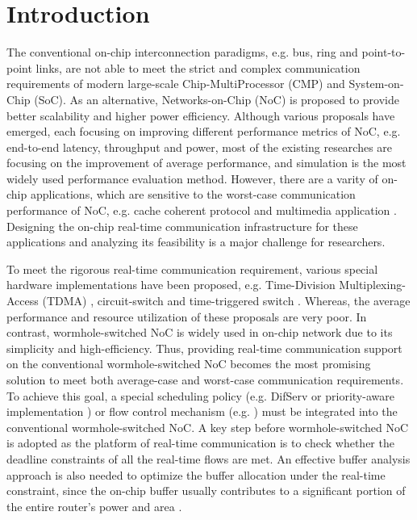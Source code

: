 \documentclass[10pt,journal]{IEEEtran}
\begin{document}
\section{Introduction}
The conventional on-chip interconnection paradigms, e.g. bus, ring and point-to-point links, are not able to meet the strict and complex communication requirements of modern large-scale Chip-MultiProcessor (CMP) and System-on-Chip (SoC). As an alternative, Networks-on-Chip (NoC) is proposed to provide better scalability and higher power efficiency. Although various proposals have emerged, each focusing on improving different performance metrics of NoC, e.g. end-to-end latency, throughput and power, most of the existing researches are focusing on the improvement of average performance, and simulation is the most widely used performance evaluation method. However, there are a varity of on-chip applications, which are sensitive to the worst-case communication performance of NoC, e.g. cache coherent protocol \cite{Bolotin2007} and multimedia application \cite{ostermann2004video}. Designing the on-chip real-time communication infrastructure for these applications and analyzing its feasibility is a major challenge for researchers.

To meet the rigorous real-time communication requirement, various special hardware implementations have been proposed, e.g. Time-Division Multiplexing-Access (TDMA) \cite{GoDR05}, circuit-switch \cite{6628254} and time-triggered switch \cite{4617280}. Whereas, the average performance and resource utilization of these proposals are very poor. In contrast, wormhole-switched NoC is widely used in on-chip network due to its simplicity and high-efficiency. Thus, providing real-time communication support on the conventional wormhole-switched NoC becomes the most promising solution to meet both average-case and worst-case communication requirements. To achieve this goal, a special scheduling policy (e.g. DifServ \cite{1411140} or priority-aware implementation \cite{Shi:2008:RCA:1397757.1397996,708526,627905}) or flow control mechanism (e.g. \cite{Li199649,707545}) must be integrated into the conventional wormhole-switched NoC. A key step before wormhole-switched NoC is adopted as the platform of real-time communication is to check whether the deadline constraints of all the real-time flows are met. An effective buffer analysis approach is also needed to optimize the buffer allocation under the real-time constraint, since the on-chip buffer usually contributes to a significant portion of the entire router's power and area \cite{pkundu,5507566}.
\end{document}
